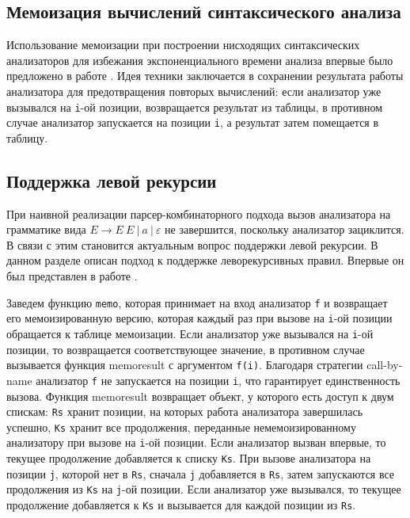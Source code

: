     \subsection{Мемоизация вычислений синтаксического анализа}
    Использование мемоизации при построении нисходящих синтаксических анализаторов для избежания экспоненциального времени анализа впервые было предложено в работе \cite{norvig1991techniques}. Идея техники заключается в сохранении результата работы анализатора для предотвращения повторых вычислений: если анализатор уже вызывался на {\tt i}-ой позиции, возвращается результат из таблицы, в противном случае анализатор запускается на позиции {\tt i}, а результат затем помещается в таблицу. 
    
    \subsection{Поддержка левой рекурсии}

При наивной реализации парсер-комбинаторного подхода вызов анализатора на грамматике вида ${E \rightarrow E \ E \ | \ a \ | \ \varepsilon}$ не завершится, поскольку анализатор зациклится. В связи с этим становится актуальным вопрос поддержки левой рекурсии. В данном разделе описан подход к поддержке леворекурсивных правил. Впервые он был представлен в работе \cite{johnson1995memoization}. 

Заведем функцию {\tt memo}, которая принимает на вход анализатор {\tt f} и возвращает его мемоизированную версию, которая каждый раз при вызове на {\tt i}-ой позиции обращается к таблице мемоизации. Если анализатор уже вызывался на {\tt i}-ой позиции, то возвращается соответствующее значение, в противном случае вызывается функция memoresult с аргументом {\tt f(i)}. Благодаря стратегии call-by-name анализатор {\tt f} не запускается на позиции {\tt i}, что гарантирует единственность вызова. Функция memoresult возвращает объект, у которого есть доступ к двум спискам: {\tt Rs} хранит позиции, на которых работа анализатора завершилась успешно, {\tt Ks} хранит все продолжения, переданные немемоизированному анализатору при вызове на {\tt i}-ой позиции. Если анализатор вызван впервые, то текущее продолжение добавляется к списку {\tt Ks}. При вызове анализатора на позиции {\tt j}, которой нет в {\tt Rs}, сначала {\tt j} добавляется  в {\tt Rs}, затем запускаются все продолжения из {\tt Ks} на {\tt j}-ой позиции. Если анализатор уже вызывался, то текущее продолжение добавляется к {\tt Ks} и вызывается для каждой позиции из {\tt Rs}.

